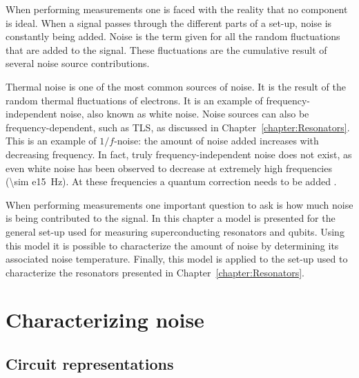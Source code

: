\documentclass[12pt]{report}
\begin{document}
When performing measurements one is faced with the reality that no component is ideal. When a signal passes through the different parts of a set-up, noise is constantly being added. Noise is the term given for all the random fluctuations that are added to the signal. These fluctuations are the cumulative result of several noise source contributions.

Thermal noise is one of the most common sources of noise. It is the result of the random thermal fluctuations of electrons. It is an example of frequency-independent noise, also known as white noise. Noise sources can also be frequency-dependent, such as TLS, as discussed in Chapter~\ref{chapter:Resonators}. This is an example of $1/f$-noise: the amount of noise added increases with decreasing frequency. In fact, truly frequency-independent noise does not exist, as even white noise has been observed to decrease at extremely high frequencies (\SI{\sim e15}{\hertz}). At these frequencies a quantum correction needs to be added \cite[p.~50]{vasilescu2006electronic}.

When performing measurements one important question to ask is how much noise is being contributed to the signal. In this chapter a model is presented for the general set-up used for measuring superconducting resonators and qubits. Using this model it is possible to characterize the amount of noise by determining its associated noise temperature. Finally, this model is applied to the set-up used to characterize the resonators presented in Chapter~\ref{chapter:Resonators}.

\section{Characterizing noise}

\subsection{Circuit representations}
\end{document}
